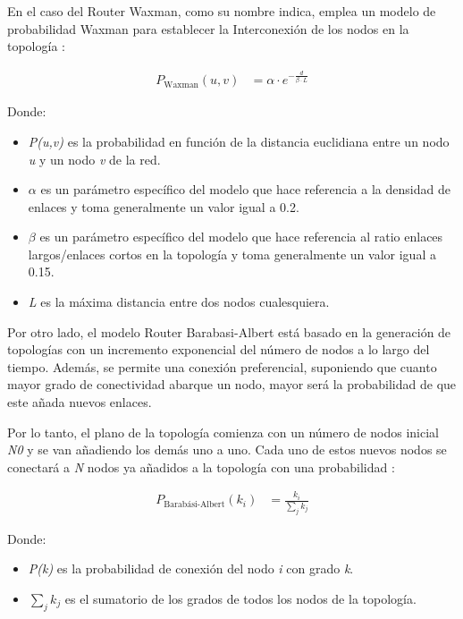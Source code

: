 \vspace{3mm}

En el caso del Router Waxman, como su nombre indica, emplea un modelo de probabilidad Waxman para establecer la Interconexión de los nodos en la topología \cite{brite_zegura}:

\begin{align}
    P_{\text{Waxman}}(u,v) &= \alpha \cdot e^{-\frac{d}{\beta \cdot L}}
\end{align}
    
    Donde:
\begin{itemize}
    \renewcommand{\labelitemi}{}
    \item \textit{P(u,v)} es la probabilidad en función de la distancia euclidiana entre un nodo \textit{u} y un nodo \textit{v} de la red.
    \item $\alpha$ es un parámetro específico del modelo que hace referencia a la densidad de enlaces y toma generalmente un valor igual a 0.2.
    \item $\beta$ es un parámetro específico del modelo que hace referencia al ratio enlaces largos/enlaces cortos en la topología y toma generalmente un valor igual a 0.15.
    \item \textit{L} es la máxima distancia entre dos nodos cualesquiera.
\end{itemize}

\vspace{3mm}

Por otro lado, el modelo Router Barabasi-Albert está basado en la generación de topologías con un incremento exponencial del número de nodos a lo largo del tiempo. Además, se permite una conexión preferencial, suponiendo que cuanto mayor grado de conectividad abarque un nodo, mayor será la probabilidad de que este añada nuevos enlaces.

\vspace{3mm}

Por lo tanto, el plano de la topología comienza con un número de nodos inicial \textit{N0} y se van añadiendo los demás uno a uno. Cada uno de estos nuevos nodos se conectará a \textit{N} nodos ya añadidos a la topología con una probabilidad \cite{brite_zegura}:

\begin{align}
    P_{\text{Barabási-Albert}}(k_i) &= \frac{k_i}{\sum_{j}^{}k_j}
\end{align}
    
    Donde:
\begin{itemize}
    \renewcommand{\labelitemi}{}
    \item \textit{P(k)} es la probabilidad de conexión del nodo \textit{i} con grado \textit{k}.
    \item $\sum_{j}^{}k_j$ es el sumatorio de los grados de todos los nodos de la topología.
\end{itemize}

